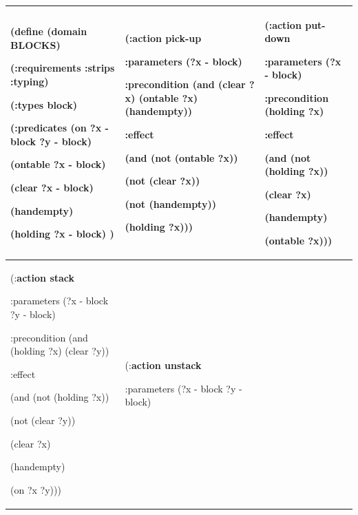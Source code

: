 \documentclass[12pt]{scrartcl}
\begin{document}
	\begin{table}
		\footnotesize
		\centering
			\begin{tabular}{|p{0.3\textwidth}|p{}|p{}|}
				\hline
				(define (\textbf{domain BLOCKS})
				
				(:requirements :strips :typing)
				
				(:types block)
				
				(:predicates (on ?x - block ?y - block)
				
				(ontable ?x - block)
				
				(clear ?x - block)
				
				(handempty)
				
				(holding ?x - block)
				)
				&
				(:\textbf{action pick-up}
				
				:parameters (?x - block)
				
				:precondition (and (clear ?x) (ontable ?x) (handempty))
				
				:effect
				
				(and (not (ontable ?x))
				
				(not (clear ?x))
				
				(not (handempty))
				
				(holding ?x)))
				&
				(:\textbf{action put-down}
				
				:parameters (?x - block)
				
				:precondition (holding ?x)
				
				:effect
				
				(and (not (holding ?x))
				
				(clear ?x)
				
				(handempty)
				
				(ontable ?x)))
				\\
				\hline
				(:\textbf{action stack}
				
				:parameters (?x - block ?y - block)
				
				:precondition (and (holding ?x) (clear ?y))
				
				:effect
				
				(and (not (holding ?x))
				
				(not (clear ?y))
				
				(clear ?x)
				
				(handempty)
				
				(on ?x ?y)))
				&
				(:\textbf{action unstack}
				
				:parameters (?x - block ?y - block)
				

\end{tabular}
\end{table}
\end{document}
